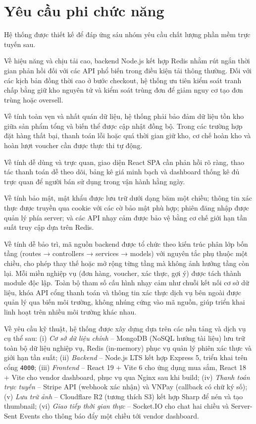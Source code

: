 \documentclass[../DoAn.tex]{subfiles}
\begin{document}
\section{Yêu cầu phi chức năng}
\label{section:2.4}
Hệ thống được thiết kế để đáp ứng sáu nhóm yêu cầu chất lượng phần mềm trực tuyến sau.

Về hiệu năng và chịu tải cao, backend Node.js kết hợp Redis nhằm rút ngắn thời gian phản hồi đối với các API phổ biến trong điều kiện tải thông thường. Đối với các kịch bản đồng thời cao ở bước checkout, hệ thống ưu tiên kiểm soát tranh chấp bằng giữ kho nguyên tử và kiểm soát trùng đơn để giảm nguy cơ tạo đơn trùng hoặc oversell.

Về tính toàn vẹn và nhất quán dữ liệu, hệ thống phải bảo đảm dữ liệu tồn kho giữa sản phẩm tổng và biến thể được cập nhật đồng bộ. Trong các trường hợp đặt hàng thất bại, thanh toán lỗi hoặc quá thời gian giữ kho, cơ chế hoàn kho và hoàn lượt voucher cần được thực thi tự động.

Về tính dễ dùng và trực quan, giao diện React SPA cần phản hồi rõ ràng, thao tác thanh toán dễ theo dõi, bảng kê giá minh bạch và dashboard thống kê đủ trực quan để người bán sử dụng trong vận hành hằng ngày.

Về tính bảo mật, mật khẩu được lưu trữ dưới dạng băm một chiều; thông tin xác thực được truyền qua cookie với các cờ bảo mật phù hợp; phiên đăng nhập được quản lý phía server; và các API nhạy cảm được bảo vệ bằng cơ chế giới hạn tần suất truy cập dựa trên Redis.

Về tính dễ bảo trì, mã nguồn backend được tổ chức theo kiến trúc phân lớp bốn tầng (routes → controllers → services → models) với nguyên tắc phụ thuộc một chiều, cho phép thay thế hoặc mở rộng từng tầng mà không ảnh hưởng tầng còn lại. Mỗi miền nghiệp vụ (đơn hàng, voucher, xác thực, gợi ý) được tách thành module độc lập. Toàn bộ tham số cấu hình nhạy cảm như chuỗi kết nối cơ sở dữ liệu, khóa API cổng thanh toán và thông tin xác thực dịch vụ bên ngoài được quản lý qua biến môi trường, không nhúng cứng vào mã nguồn, giúp triển khai linh hoạt trên nhiều môi trường khác nhau.

Về yêu cầu kỹ thuật, hệ thống được xây dựng dựa trên các nền tảng và dịch vụ cụ thể sau: (i) \textit{Cơ sở dữ liệu chính} -- MongoDB (NoSQL hướng tài liệu) lưu trữ toàn bộ dữ liệu nghiệp vụ, Redis (in-memory) phục vụ quản lý phiên xác thực và giới hạn tần suất; (ii) \textit{Backend} -- Node.js LTS kết hợp Express 5, triển khai trên cổng \texttt{4000}; (iii) \textit{Frontend} -- React 19 + Vite 6 cho ứng dụng mua sắm, React 18 + Vite cho vendor dashboard, phục vụ qua Nginx sau khi build; (iv) \textit{Thanh toán trực tuyến} -- Stripe API (webhook xác nhận) và VNPay (callback có chữ ký số); (v) \textit{Lưu trữ ảnh} -- Cloudflare R2 (tương thích S3) kết hợp Sharp để nén và tạo thumbnail; (vi) \textit{Giao tiếp thời gian thực} -- Socket.IO cho chat hai chiều và Server-Sent Events cho thông báo đẩy một chiều tới vendor dashboard.
\end{document}
